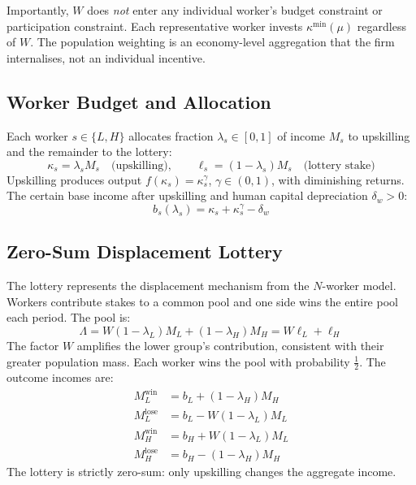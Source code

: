 \documentclass[12pt,a4paper]{article}
\begin{document}
Importantly, $W$ does \emph{not} enter any individual worker's budget
constraint or participation constraint. Each representative worker
invests $\kappa^{\min}(\mu)$ regardless of $W$. The population weighting
is an economy-level aggregation that the firm internalises, not an
individual incentive.

\subsection{Worker Budget and Allocation}

Each worker $s \in \{L, H\}$ allocates fraction $\lambda_s \in [0,1]$
of income $M_s$ to upskilling and the remainder to the lottery:
\begin{equation}
  \kappa_s = \lambda_s M_s \quad \text{(upskilling)},
  \qquad
  \ell_s = (1-\lambda_s)M_s \quad \text{(lottery stake)}
  \label{eq:budget}
\end{equation}
Upskilling produces output $f(\kappa_s) = \kappa_s^\gamma$,
$\gamma \in (0,1)$, with diminishing returns. The certain base income
after upskilling and human capital depreciation $\delta_w > 0$:
\begin{equation}
  b_s(\lambda_s) = \kappa_s + \kappa_s^\gamma - \delta_w
  \label{eq:base_income}
\end{equation}

\subsection{Zero-Sum Displacement Lottery}

The lottery represents the displacement mechanism from the $N$-worker
model. Workers contribute stakes to a common pool and one side wins the
entire pool each period. The pool is:
\begin{equation}
  \Lambda = W(1-\lambda_L)M_L + (1-\lambda_H)M_H = W\ell_L + \ell_H
  \label{eq:pool}
\end{equation}
The factor $W$ amplifies the lower group's contribution, consistent
with their greater population mass. Each worker wins the pool with
probability $\tfrac{1}{2}$. The outcome incomes are:
\begin{align}
  M_L^{\mathrm{win}}  &= b_L + (1-\lambda_H)M_H \label{eq:MLwin} \\
  M_L^{\mathrm{lose}} &= b_L - W(1-\lambda_L)M_L \label{eq:MLlose} \\
  M_H^{\mathrm{win}}  &= b_H + W(1-\lambda_L)M_L \label{eq:MHwin} \\
  M_H^{\mathrm{lose}} &= b_H - (1-\lambda_H)M_H \label{eq:MHlose}
\end{align}
The lottery is strictly zero-sum: only upskilling changes the aggregate
income.
\end{document}
